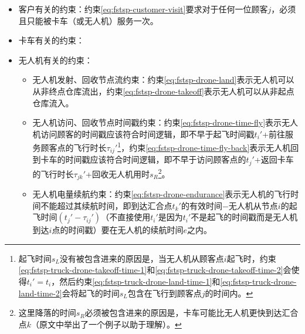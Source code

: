 \begin{itemize}
    \item \colorbox{shallow-green}{客户有关的约束：}约束\ref{eq:fstsp-customer-visit}要求对于任何一位顾客$j$，必须且只能被卡车（或无人机）服务一次。
    \item \colorbox{shallow-purple}{卡车有关的约束：}
    \item \colorbox{shallow-red}{无人机有关的约束：}
    \begin{itemize}
        \item 无人机发射、回收节点流约束：约束\ref{eq:fstsp-drone-land}表示无人机可以从非终点仓库流出，约束\ref{eq:fstsp-drone-takeoff}表示无人机可以从非起点仓库流入。
        \item 无人机访问、回收节点时间戳约束：约束\ref{eq:fstsp-drone-time-fly}表示无人机访问顾客的时间戳应该符合时间逻辑，即不早于起飞时间戳$t_i'$+前往服务顾客点的飞行时长$\tau_{ij}'$\footnote{起飞时间$s_L$没有被包含进来的原因是，当无人机从顾客点$i$起飞时，约束\ref{eq:fstsp-truck-drone-takeoff-time-1}和\ref{eq:fstsp-truck-drone-takeoff-time-2}会使得$t_i' = t_i$，然后约束\ref{eq:fstsp-truck-drone-land-time-1}和\ref{eq:fstsp-truck-drone-land-time-2}会将起飞的时间$s_L$包含在飞行到顾客点$j$的时间内。}，约束\ref{eq:fstsp-drone-time-fly-back}表示无人机回到卡车的时间戳应该符合时间逻辑，即不早于访问顾客点的$t_j'$+返回卡车的飞行时长$\tau_{jk}'$+回收无人机用时$s_R$\footnote{这里降落的时间$s_R$必须被包含进来的原因是，卡车可能比无人机更快到达汇合点$k$（原文中举出了一个例子以助于理解\cite{murrayFlyingSidekickTraveling2015}）。}。
        \item 无人机电量续航约束：约束\ref{eq:fstsp-drone-endurance}表示无人机的飞行时间不能超过其续航时间，即到达汇合点$t_k'$的有效时间$-$无人机从节点$i$的起飞时间$(t_j'-\tau_{ij}')$（不直接使用$t_i'$是因为$t_i'$不是起飞的时间戳而是无人机到达$i$点的时间戳）要在无人机的续航时间$e$之内。

\end{itemize}
\end{itemize}
